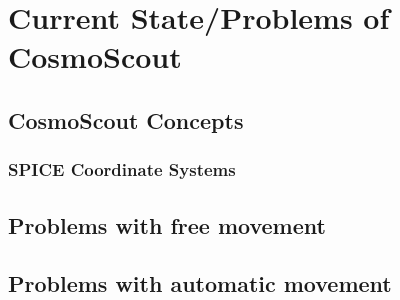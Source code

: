 \chapter{Current State/Problems of CosmoScout}\label{ch:current-state/problems-of-cosmoscout}


\section{CosmoScout Concepts}\label{sec:cosmoscout-concepts}
\subsection{SPICE Coordinate Systems}\label{subsec:spice-coordinate-systems}


\section{Problems with free movement}\label{sec:problems-with-free-movement}


\section{Problems with automatic movement}\label{sec:problems-with-automatic-movement}
